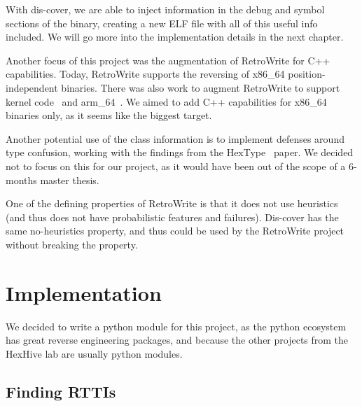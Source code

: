 \documentclass[a4paper,11pt,oneside]{report}
\begin{document}
With dis-cover, we are able to inject information in the debug and symbol sections of the binary, creating a new ELF file with all of this useful info included.
We will go more into the implementation details in the next chapter.

Another focus of this project was the augmentation of RetroWrite for C++ capabilities.
Today, RetroWrite supports the reversing of x86\_64 position-independent binaries.
There was also work to augment RetroWrite to support kernel code~\cite{rwkernel} and arm\_64~\cite{rwarm}.
We aimed to add C++ capabilities for x86\_64 binaries only, as it seems like the biggest target.

Another potential use of the class information is to implement defenses around type confusion, working with the findings from the HexType~\cite{hextype} paper.
We decided not to focus on this for our project, as it would have been out of the scope of a 6-months master thesis.

One of the defining properties of RetroWrite is that it does not use heuristics (and thus does not have probabilistic features and failures).
Dis-cover has the same no-heuristics property, and thus could be used by the RetroWrite project without breaking the property.


\chapter{Implementation}



We decided to write a python module for this project, as the python ecosystem has great reverse engineering packages, and because the other projects from the HexHive lab are usually python modules.

\section{Finding RTTIs}
\end{document}
